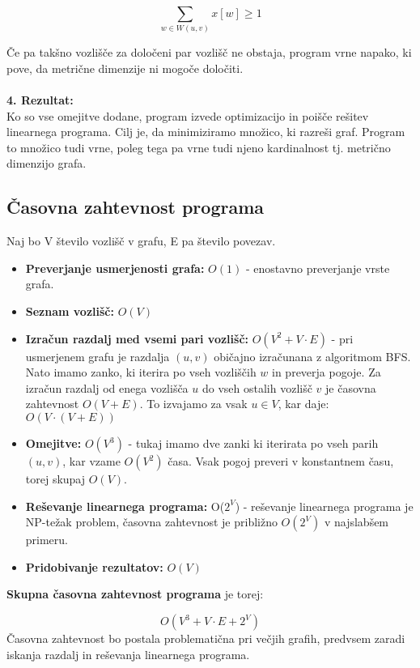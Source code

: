 \documentclass[a4paper,12pt]{article}
\theoremstyle{definition}
\theoremstyle{remark}
\theoremstyle{definition}
\begin{document}
\[
\sum_{w \in W(u, v)} x[w] \geq 1
\]

\noindent
Če pa takšno vozlišče za določeni par vozlišč ne obstaja, program vrne napako, ki pove, da metrične dimenzije ni mogoče določiti.
\\
\\
\noindent
\textbf{4. Rezultat:}\\
Ko so vse omejitve dodane, program izvede optimizacijo in poišče rešitev linearnega programa. 
Cilj je, da minimiziramo množico, ki razreši graf. Program to množico tudi vrne, poleg tega pa vrne tudi njeno kardinalnost tj. metrično dimenzijo grafa.



\subsection*{Časovna zahtevnost programa}

Naj bo V število vozlišč v grafu, E pa število povezav.
\begin{itemize}
    \item \textbf{Preverjanje usmerjenosti grafa:} $O(1)$ - enostavno preverjanje vrste grafa.
    \item \textbf{Seznam vozlišč:} $O(V)$ 
    \item \textbf{Izračun razdalj med vsemi pari vozlišč:} $O(V^2 + V \cdot E)$ - pri usmerjenem grafu je razdalja $(u,v)$ običajno izračunana z algoritmom BFS.
    Nato imamo zanko, ki iterira po vseh vozliščih $w$ in preverja pogoje. Za izračun razdalj od enega vozlišča $u$ do vseh ostalih vozlišč $v$ je časovna zahtevnost $O(V+E)$.
    To izvajamo za vsak $u \in V$, kar daje: $O(V\cdot(V+E))$
    \item \textbf{Omejitve:} $O(V^3)$ - tukaj imamo dve zanki ki iterirata po vseh parih $(u, v)$, kar vzame $O(V^2)$ časa. 
    Vsak pogoj preveri v konstantnem času, torej skupaj $O(V)$.
    \item \textbf{Reševanje linearnega programa:} O($2^V$) - reševanje linearnega programa je NP-težak problem, časovna zahtevnost je približno $O(2^V)$ 
    v najslabšem primeru.
    \item \textbf{Pridobivanje rezultatov:} $O(V)$
\end{itemize}

\noindent
\textbf{Skupna časovna zahtevnost programa} je torej:

\[
O(V^3 + V \cdot E + 2^V)
\]
\noindent
Časovna zahtevnost bo postala problematična pri večjih grafih, predvsem zaradi iskanja razdalj in reševanja linearnega programa.
\end{document}
